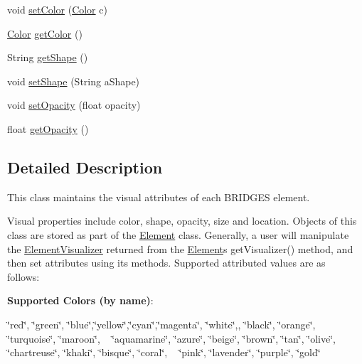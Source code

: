 \begin{DoxyCompactItemize}
\item 
void \hyperlink{classbridges_1_1base_1_1_element_visualizer_a33172ab908f3b6f9740727b0bfe91565}{set\+Color} (\hyperlink{classbridges_1_1base_1_1_color}{Color} c)
\item 
\hyperlink{classbridges_1_1base_1_1_color}{Color} \hyperlink{classbridges_1_1base_1_1_element_visualizer_a3bf821b9bfa02746882bac934ce4fb8e}{get\+Color} ()
\item 
String \hyperlink{classbridges_1_1base_1_1_element_visualizer_a8ef0825745e49f32b57e4bf6c891b57e}{get\+Shape} ()
\item 
void \hyperlink{classbridges_1_1base_1_1_element_visualizer_ac3bad991904c8ad23e5233b341381d93}{set\+Shape} (String a\+Shape)
\item 
void \hyperlink{classbridges_1_1base_1_1_element_visualizer_a932f62eb1bd0c92da265a7f903dd0790}{set\+Opacity} (float opacity)
\item 
float \hyperlink{classbridges_1_1base_1_1_element_visualizer_ab86ff39f17f8d1766670b18be88b5492}{get\+Opacity} ()
\end{DoxyCompactItemize}


\subsection{Detailed Description}
This class maintains the visual attributes of each B\+R\+I\+D\+G\+ES element. 

Visual properties include color, shape, opacity, size and location. Objects of this class are stored as part of the \hyperlink{classbridges_1_1base_1_1_element}{Element} class. Generally, a user will manipulate the \hyperlink{classbridges_1_1base_1_1_element_visualizer}{Element\+Visualizer} returned from the \hyperlink{classbridges_1_1base_1_1_element}{Element}\textquotesingle{}s get\+Visualizer() method, and then set attributes using its methods. Supported attributed values are as follows\+:~\newline


{\bfseries Supported Colors (by name)}\+: 

\char`\"{}red\char`\"{}, \char`\"{}green\char`\"{}, \char`\"{}blue\char`\"{},\char`\"{}yellow\char`\"{},\char`\"{}cyan\char`\"{},\char`\"{}magenta\char`\"{}, \char`\"{}white\char`\"{},, \char`\"{}black\char`\"{}, \char`\"{}orange\char`\"{}, \char`\"{}turquoise\char`\"{}, \char`\"{}maroon\char`\"{}, ~\newline
 \char`\"{}aquamarine\char`\"{}, \char`\"{}azure\char`\"{}, \char`\"{}beige\char`\"{}, \char`\"{}brown\char`\"{}, \char`\"{}tan\char`\"{}, \char`\"{}olive\char`\"{}, \char`\"{}chartreuse\char`\"{}, \char`\"{}khaki\char`\"{}, \char`\"{}bisque\char`\"{}, \char`\"{}coral\char`\"{}, ~\newline
 \char`\"{}pink\char`\"{}, \char`\"{}lavender\char`\"{}, \char`\"{}purple\char`\"{}, \char`\"{}gold\char`\"{} 

